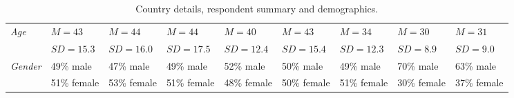 \documentclass[sigconf]{acmart}
\begin{document}
\begin{table*}
\begin{tabularx}{\textwidth}{@{}l XXXXXXXX@{}}
\midrule



\emph{Age}   & \small{$M=43$}    & \small{$M=44$}    & \small{$M=44$}    & \small{$M=40$}    & \small{$M=43$}    & \small{$M=34$}    & \small{$M=30$}    & \small{$M=31$}  \\
             & \scriptsize{$SD=15.3$} & \scriptsize{$SD=16.0$} & \scriptsize{$SD=17.5$} & \scriptsize{$SD=12.4$} & \scriptsize{$SD=15.4$} & \scriptsize{$SD=12.3$} & \scriptsize{$SD=8.9$} & \scriptsize{$SD=9.0$} \\       
\midrule
        




\emph{Gender}  & \small{49\%}\scriptsize{ male}   & 
                 \small{47\%}\scriptsize{ male}   & 
                 \small{49\%}\scriptsize{ male}   & 
                 \small{52\%}\scriptsize{ male}   & 
                 \small{50\%}\scriptsize{ male}   & 
                 \small{49\%}\scriptsize{ male}   & 
                 \small{70\%}\scriptsize{ male}   & 
                 \small{63\%}\scriptsize{ male}   \\
                 
               & \small{51\%}\scriptsize{ female}  
               & \small{53\%}\scriptsize{ female}    
               & \small{51\%}\scriptsize{ female}    
               & \small{48\%}\scriptsize{ female}    
               & \small{50\%}\scriptsize{ female}    
               & \small{51\%}\scriptsize{ female}    
               & \small{30\%}\scriptsize{ female}    
               & \small{37\%}\scriptsize{ female}    \\
               
\bottomrule

\end{tabularx}

\caption{ Country details, respondent summary and demographics. }
\label{tab:demographics}

\end{table*}
 
\end{document}

